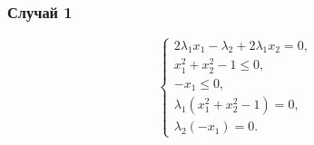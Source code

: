 \documentclass[12pt,a4paper,oneside]{extarticle}
\begin{document}
        \subsubsection{Случай 1}
        \begin{equation*}
            \begin{cases}
                2\lambda_1x_1 - \lambda_2 + 2\lambda_1x_2 = 0, \\
                x_1^2+x_2^2 - 1 \le 0, \\
                -x_1 \le 0, \\
                \lambda_1(x_1^2+x_2^2 - 1) = 0, \\
                \lambda_2(-x_1) = 0.
            \end{cases}
        \end{equation*}
\end{document}
